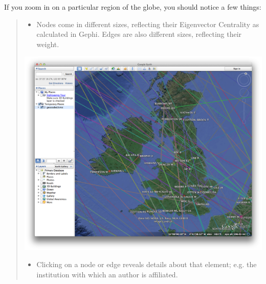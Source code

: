 \documentclass[letterpaper,10pt,english]{sphinxmanual}
\begin{document}
If you zoom in on a particular region of the globe, you should notice a few things:
\begin{quote}
\begin{itemize}
\item {} 
Nodes come in different sizes, reflecting their Eigenvector Centrality as calculated
in Gephi. Edges are also different sizes, reflecting their weight.

\end{itemize}

{\hfill\includegraphics{geo13.png}\hfill}
\begin{itemize}
\item {} 
Clicking on a node or edge reveals details about that element; e.g. the institution
with which an author is affiliated.

\end{itemize}


\end{quote}
\end{document}
